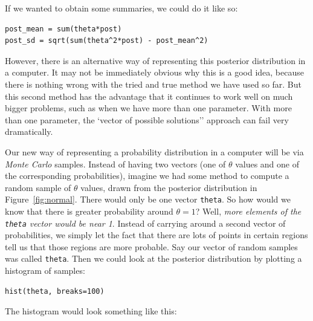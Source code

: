 If we wanted to obtain some summaries, we could do it like so:
\begin{verbatim}
post_mean = sum(theta*post)
post_sd = sqrt(sum(theta^2*post) - post_mean^2)
\end{verbatim}

However,
there is an alternative way of representing this posterior distribution in a
computer. It may not be immediately obvious why this is a good idea,
because there is nothing wrong with the tried and true method we have used
so far. But this second method has the advantage that it continues to
work well on much bigger problems, such as when we have more than one parameter.
With more than one parameter, the `vector of possible solutions'' approach
can fail very dramatically.

Our new way of representing a probability distribution in a computer will be
via {\it Monte Carlo} samples.
Instead of having two vectors (one of $\theta$ values and one of the
corresponding probabilities),
imagine we had some method to compute a random sample of $\theta$ values, drawn
from the posterior distribution in Figure~\ref{fig:normal}.
There would only be one vector {\tt theta}. So how would we
know that there is greater probability around $\theta=1$? Well, {\it more elements
of the {\tt theta} vector would be near 1}.
Instead of carrying around a second vector of
probabilities, we simply let the fact that there are lots of points in certain
regions tell us that those regions are more probable. Say our vector of random
samples was called {\tt theta}. Then we could look at the posterior distribution
by plotting a histogram of samples:
\begin{verbatim}
hist(theta, breaks=100)
\end{verbatim}
The histogram would look something like this:

